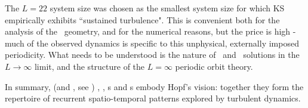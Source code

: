 The {\KS} $L=22$ system size was chosen as the smallest
system size for which KS empirically exhibits
``sustained turbulence".
This is convenient both for
the analysis of the \statesp\ geometry, and for the numerical reasons,
 but the price is high - much of the
observed dynamics is specific to this unphysical, externally
imposed periodicity. What needs to be
understood is the nature of \eqv\ and \rpo\ solutions in the
$L \to \infty$ limit, and the structure of the $L = \infty$ periodic orbit
theory.

In summary, {\KS} (and \pCf, see )  \eqva, \reqva, \po s and
\rpo s embody Hopf's vision: together they form the
 repertoire of recurrent spatio-temporal
patterns explored by turbulent dynamics.

